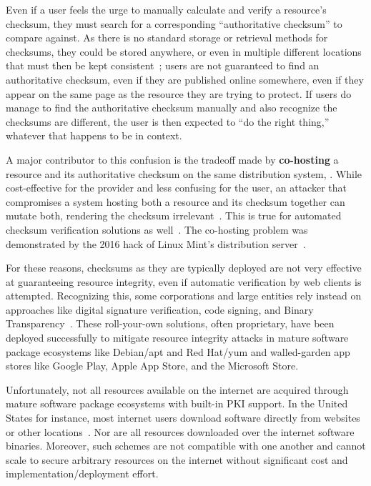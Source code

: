 Even if a user feels the urge to manually calculate and verify a resource's
checksum, they must search for a corresponding ``authoritative checksum'' to
compare against. As there is no standard storage or retrieval methods for
checksums, they could be stored anywhere, or even in multiple different
locations that must then be kept consistent~\cite{Cherubini}; users are not
guaranteed to find an authoritative checksum, even if they are published online
somewhere, even if they appear on the same page as the resource they are trying
to protect. If users do manage to find the authoritative checksum manually and
also recognize the checksums are different, the user is then expected to ``do
the right thing,'' whatever that happens to be in context.

A major contributor to this confusion is the tradeoff made by
\textbf{co-hosting} a resource and its authoritative checksum on the same
distribution system, . While
cost-effective for the provider and less confusing for the user, an attacker
that compromises a system hosting both a resource and its checksum together can
mutate both, rendering the checksum irrelevant~\cite{Stickler}. This is true for
automated checksum verification solutions as well~\cite{Cherubini}. The
co-hosting problem was demonstrated by the 2016 hack of Linux Mint's
distribution server~\cite{SCA-MINT1, SCA-MINT2}.

For these reasons, checksums as they are typically deployed are not very
effective at guaranteeing resource integrity, even if automatic verification by
web clients is attempted. Recognizing this, some corporations and large entities
rely instead on approaches like digital signature verification, code signing,
and Binary Transparency~\cite{PKI, BinaryTransparency}. These roll-your-own
solutions, often proprietary, have been deployed successfully to mitigate
resource integrity attacks in mature software package ecosystems like Debian/apt
and Red Hat/yum and walled-garden app stores like Google Play, Apple App Store,
and the Microsoft Store.

Unfortunately, not all resources available on the internet are acquired through
mature software package ecosystems with built-in PKI support. In the United
States for instance, most internet users download software directly from
websites or other locations~\cite{Cherubini, Ryan}. Nor are all resources
downloaded over the internet software binaries. Moreover, such schemes are not
compatible with one another and cannot scale to secure arbitrary resources on
the internet without significant cost and implementation/deployment effort.

